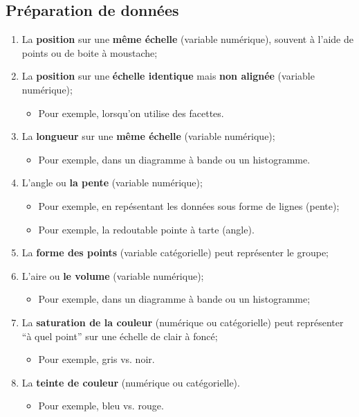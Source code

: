 \documentclass[10pt, french]{article}
\begin{document}
\begin{multicols*}{3} 

\section{Préparation de données}

\begin{algo2}
\begin{enumerate}
	\item	La \textbf{position} sur une \textbf{même échelle} (variable numérique), souvent à l’aide de points ou de boite à moustache;
	\item	La \textbf{position} sur une \textbf{échelle identique} mais \textbf{non alignée} (variable numérique);
		\begin{itemize}
		\item	Pour exemple, lorsqu’on utilise des facettes.
		\end{itemize}
	\item	La \textbf{longueur} sur une \textbf{même échelle} (variable numérique);
		\begin{itemize}
		\item	Pour exemple, dans un diagramme à bande ou un histogramme.
		\end{itemize}
	\item	L’angle ou \textbf{la pente} (variable numérique);
		\begin{itemize}
		\item	Pour exemple, en repésentant les données sous forme de lignes (pente);
		\item	Pour exemple, la redoutable pointe à tarte (angle).
		\end{itemize}
	\item	La \textbf{forme des points} (variable catégorielle) peut représenter le groupe;
	\item	L’aire ou \textbf{le volume} (variable numérique);
		\begin{itemize}
		\item	Pour exemple, dans un diagramme à bande ou un histogramme;
		\end{itemize}
	\item	La \textbf{saturation de la couleur} (numérique ou catégorielle) peut représenter “à quel point” sur une échelle de clair à foncé;
		\begin{itemize}
		\item	Pour exemple, gris vs. noir.
		\end{itemize}
	\item	La \textbf{teinte de couleur} (numérique ou catégorielle).
		\begin{itemize}
		\item	Pour exemple, bleu vs. rouge.
		\end{itemize}
\end{enumerate}
\end{algo2}


\end{multicols*}
\end{document}
